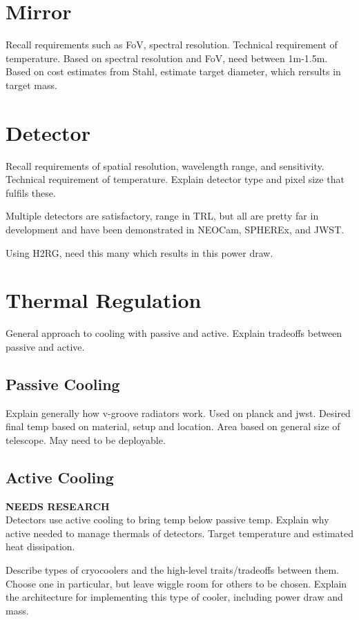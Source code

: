 \documentclass{ws-jai}
\begin{document}
\section{Mirror}
Recall requirements such as FoV, spectral resolution. Technical requirement of temperature.
Based on spectral resolution and FoV, need between 1m-1.5m. Based on cost estimates from Stahl, estimate target diameter, which rersults in target mass.

\section{Detector}
Recall requirements of spatial resolution, wavelength range, and sensitivity. Technical requirement of temperature. Explain detector type and pixel size that fulfils these.

Multiple detectors are satisfactory, range in TRL, but all are pretty far in development and have been demonstrated in NEOCam, SPHEREx, and JWST\@.

Using H2RG, need this many which results in this power draw.

\section{Thermal Regulation}
General approach to cooling with passive and active. Explain tradeoffs between passive and active.

\subsection{Passive Cooling}
Explain generally how v-groove radiators work. Used on planck and jwst. Desired final temp based on material, setup and location. Area based on general size of telescope. May need to be deployable.

\subsection{Active Cooling}
\textbf{NEEDS RESEARCH}\\
Detectors use active cooling to bring temp below passive temp. Explain why active needed to manage thermals of detectors. Target temperature and estimated heat dissipation.

Describe types of cryocoolers and the high-level traits/tradeoffs between them. Choose one in particular, but leave wiggle room for others to be chosen. Explain the architecture for implementing this type of cooler, including power draw and mass.
\end{document}
